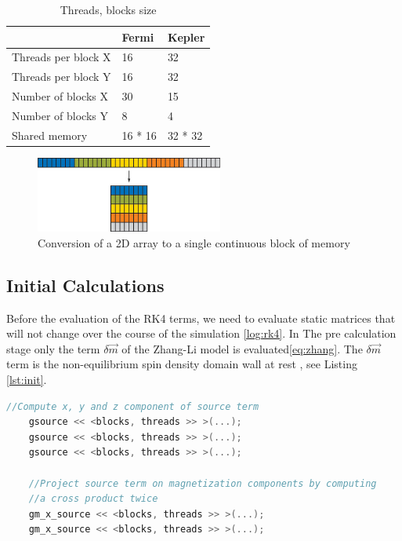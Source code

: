 \begin{table}[h]
\centering
\begin{tabular}{| l | l | l |}
\hline
 & Fermi & Kepler \\
\hline
Threads per block X  & 16 & 32 \\
\hline
Threads per block Y  & 16 & 32 \\
\hline
Number of blocks X & 30 & 15 \\
\hline
Number of blocks Y & 8 & 4 \\
\hline
Shared memory & 16 * 16 & 32 * 32 \\
\hline
\end{tabular}
\caption{Threads, blocks size}
\label{tab:threads}
\end{table}


\begin{figure}[htbp]
	\centering
		\includegraphics[width=0.55\textwidth]{Figures/flaten.png}
		\smallskip
	\caption[2D Flatten array]{Conversion of a 2D array to a single continuous block of memory}
	\label{fig:flaten}
\end{figure}


\subsection{Initial Calculations}

Before the evaluation of the RK4 terms, we need to evaluate static matrices that will not change over the course of the simulation \ref{log:rk4}. In The pre calculation stage only the term $ \delta \vec{m}$ of the Zhang-Li model is evaluated\ref{eq:zhang}. The $ \delta \vec{m}$ term is the non-equilibrium spin density domain wall at rest \cite{claudio}, see Listing \ref{lst:init}.

\begin{lstlisting}[language=C++, label={lst:init}, caption={Initial calculations}]
	//Compute x, y and z component of source term
    gsource << <blocks, threads >> >(...);
    gsource << <blocks, threads >> >(...);
    gsource << <blocks, threads >> >(...);

    //Project source term on magnetization components by computing
    //a cross product twice
    gm_x_source << <blocks, threads >> >(...);
    gm_x_source << <blocks, threads >> >(...);
\end{lstlisting}

